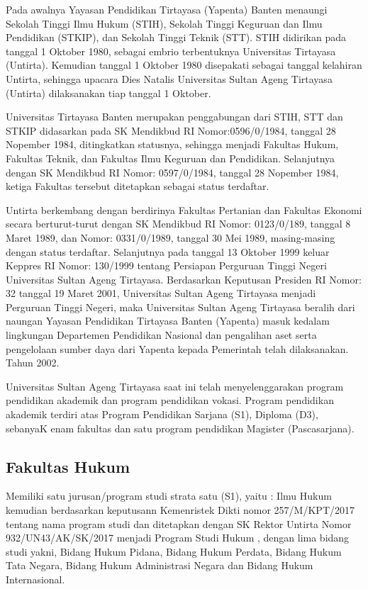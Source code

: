 \documentclass[
]{book}
\begin{document}
Pada awalnya Yayasan Pendidikan Tirtayasa (Yapenta) Banten menaungi Sekolah Tinggi Ilmu Hukum (STIH), Sekolah Tinggi Keguruan dan Ilmu Pendidikan (STKIP), dan Sekolah Tinggi Teknik (STT). STIH didirikan pada tanggal 1 Oktober 1980, sebagai embrio terbentuknya Universitas Tirtayasa (Untirta). Kemudian tanggal 1 Oktober 1980 disepakati sebagai tanggal kelahiran Untirta, sehingga upacara Dies Natalis Universitas Sultan Ageng Tirtayasa (Untirta) dilaksanakan tiap tanggal 1 Oktober.

Universitas Tirtayasa Banten merupakan penggabungan dari STIH, STT dan STKIP didasarkan pada SK Mendikbud RI Nomor:0596/0/1984, tanggal 28 Nopember 1984, ditingkatkan statusnya, sehingga menjadi Fakultas Hukum, Fakultas Teknik, dan Fakultas Ilmu Keguruan dan Pendidikan. Selanjutnya dengan SK Mendikbud RI Nomor: 0597/0/1984, tanggal 28 Nopember 1984, ketiga Fakultas tersebut ditetapkan sebagai status terdaftar.

Untirta berkembang dengan berdirinya Fakultas Pertanian dan Fakultas Ekonomi secara berturut-turut dengan SK Mendikbud RI Nomor: 0123/0/189, tanggal 8 Maret 1989, dan Nomor: 0331/0/1989, tanggal 30 Mei 1989, masing-masing dengan status terdaftar. Selanjutnya pada tanggal 13 Oktober 1999 keluar Keppres RI Nomor: 130/1999 tentang Persiapan Perguruan Tinggi Negeri Universitas Sultan Ageng Tirtayasa. Berdasarkan Keputusan Presiden RI Nomor: 32 tanggal 19 Maret 2001, Universitas Sultan Ageng Tirtayasa menjadi Perguruan Tinggi Negeri, maka Universitas Sultan Ageng Tirtayasa beralih dari naungan Yayasan Pendidikan Tirtayasa Banten (Yapenta) masuk kedalam lingkungan Departemen Pendidikan Nasional dan pengalihan aset serta pengelolaan sumber daya dari Yapenta kepada Pemerintah telah dilaksanakan. Tahun 2002.

Universitas Sultan Ageng Tirtayasa saat ini telah menyelenggarakan program pendidikan akademik dan program pendidikan vokasi. Program pendidikan akademik terdiri atas Program Pendidikan Sarjana (S1), Diploma (D3), sebanyaK enam fakultas dan satu program pendidikan Magister (Pascasarjana).

\hypertarget{fakultas-hukum}{%
\subsection{Fakultas Hukum}\label{fakultas-hukum}}

Memiliki satu jurusan/program studi strata satu (S1), yaitu : Ilmu Hukum kemudian berdasarkan keputusann Kemenristek Dikti nomor 257/M/KPT/2017 tentang nama program studi dan ditetapkan dengan SK Rektor Untirta Nomor 932/UN43/AK/SK/2017 menjadi Program Studi Hukum , dengan lima bidang studi yakni, Bidang Hukum Pidana, Bidang Hukum Perdata, Bidang Hukum Tata Negara, Bidang Hukum Administrasi Negara dan Bidang Hukum Internasional.
\end{document}
